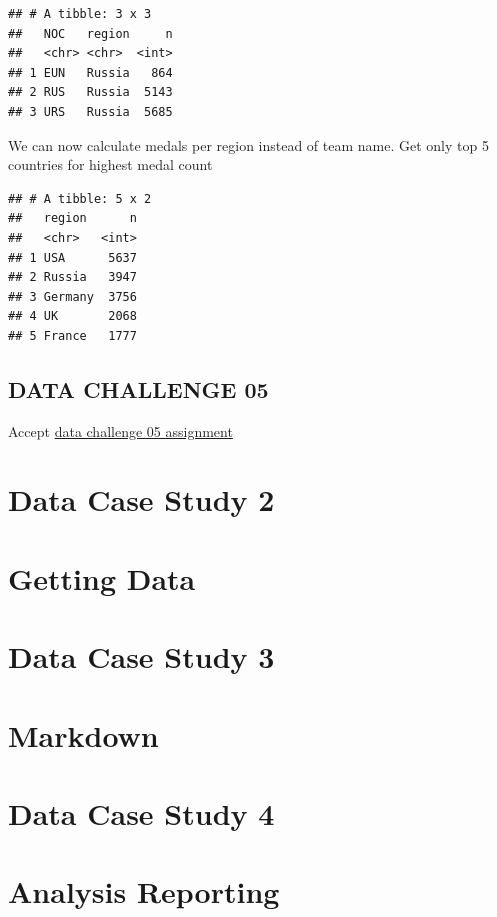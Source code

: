 \documentclass[
]{book}
\begin{document}
\begin{verbatim}
## # A tibble: 3 x 3
##   NOC   region     n
##   <chr> <chr>  <int>
## 1 EUN   Russia   864
## 2 RUS   Russia  5143
## 3 URS   Russia  5685
\end{verbatim}

We can now calculate medals per region instead of team name.
Get only top 5 countries for highest medal count

\begin{verbatim}
## # A tibble: 5 x 2
##   region      n
##   <chr>   <int>
## 1 USA      5637
## 2 Russia   3947
## 3 Germany  3756
## 4 UK       2068
## 5 France   1777
\end{verbatim}

\hypertarget{data-challenge-05}{%
\section{DATA CHALLENGE 05}\label{data-challenge-05}}

Accept \href{https://classroom.github.com/a/6eey650g}{data challenge 05 assignment}

\hypertarget{data-case-study-2}{%
\chapter{Data Case Study 2}\label{data-case-study-2}}

\hypertarget{getting-data}{%
\chapter{Getting Data}\label{getting-data}}

\hypertarget{data-case-study-3}{%
\chapter{Data Case Study 3}\label{data-case-study-3}}

\hypertarget{markdown}{%
\chapter{Markdown}\label{markdown}}

\hypertarget{data-case-study-4}{%
\chapter{Data Case Study 4}\label{data-case-study-4}}

\hypertarget{analysis-reporting}{%
\chapter{Analysis Reporting}\label{analysis-reporting}}

  
\end{document}
